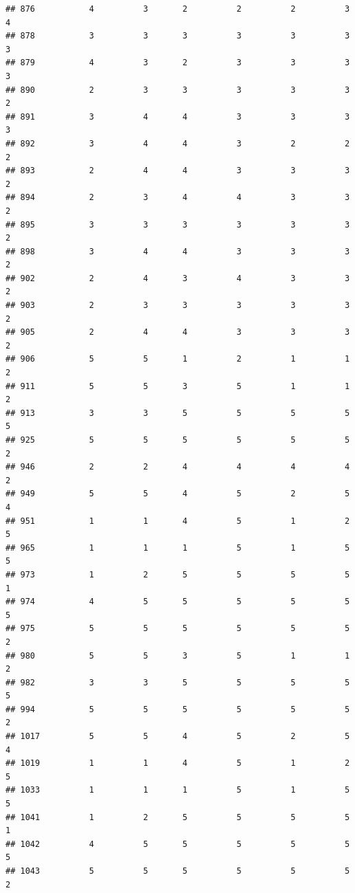 \documentclass[
]{article}
\begin{document}
\begin{verbatim}
## 876           4          3       2          2          2          3        4
## 878           3          3       3          3          3          3        3
## 879           4          3       2          3          3          3        3
## 890           2          3       3          3          3          3        2
## 891           3          4       4          3          3          3        3
## 892           3          4       4          3          2          2        2
## 893           2          4       4          3          3          3        2
## 894           2          3       4          4          3          3        2
## 895           3          3       3          3          3          3        2
## 898           3          4       4          3          3          3        2
## 902           2          4       3          4          3          3        2
## 903           2          3       3          3          3          3        2
## 905           2          4       4          3          3          3        2
## 906           5          5       1          2          1          1        2
## 911           5          5       3          5          1          1        2
## 913           3          3       5          5          5          5        5
## 925           5          5       5          5          5          5        2
## 946           2          2       4          4          4          4        2
## 949           5          5       4          5          2          5        4
## 951           1          1       4          5          1          2        5
## 965           1          1       1          5          1          5        5
## 973           1          2       5          5          5          5        1
## 974           4          5       5          5          5          5        5
## 975           5          5       5          5          5          5        2
## 980           5          5       3          5          1          1        2
## 982           3          3       5          5          5          5        5
## 994           5          5       5          5          5          5        2
## 1017          5          5       4          5          2          5        4
## 1019          1          1       4          5          1          2        5
## 1033          1          1       1          5          1          5        5
## 1041          1          2       5          5          5          5        1
## 1042          4          5       5          5          5          5        5
## 1043          5          5       5          5          5          5        2

\end{verbatim}
\end{document}
